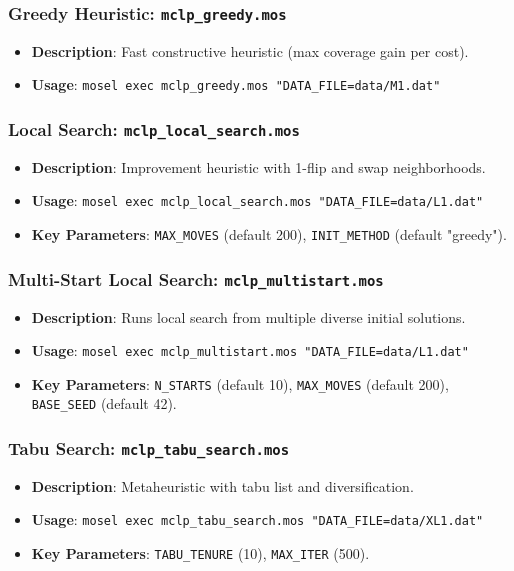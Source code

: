 \documentclass[11pt,a4paper]{article}
\begin{document}
\subsubsection{Greedy Heuristic: \texttt{mclp\_greedy.mos}}
\begin{itemize}
  \item \textbf{Description}: Fast constructive heuristic (max coverage gain per cost).
  \item \textbf{Usage}: \texttt{mosel exec mclp\_greedy.mos "DATA\_FILE=data/M1.dat"}
\end{itemize}

\subsubsection{Local Search: \texttt{mclp\_local\_search.mos}}
\begin{itemize}
  \item \textbf{Description}: Improvement heuristic with 1-flip and swap neighborhoods.
  \item \textbf{Usage}: \texttt{mosel exec mclp\_local\_search.mos "DATA\_FILE=data/L1.dat"}
  \item \textbf{Key Parameters}: \texttt{MAX\_MOVES} (default 200), \texttt{INIT\_METHOD} (default "greedy").
\end{itemize}

\subsubsection{Multi-Start Local Search: \texttt{mclp\_multistart.mos}}
\begin{itemize}
  \item \textbf{Description}: Runs local search from multiple diverse initial solutions.
  \item \textbf{Usage}: \texttt{mosel exec mclp\_multistart.mos "DATA\_FILE=data/L1.dat"}
  \item \textbf{Key Parameters}: \texttt{N\_STARTS} (default 10), \texttt{MAX\_MOVES} (default 200), \texttt{BASE\_SEED} (default 42).
\end{itemize}

\subsubsection{Tabu Search: \texttt{mclp\_tabu\_search.mos}}
\begin{itemize}
  \item \textbf{Description}: Metaheuristic with tabu list and diversification.
  \item \textbf{Usage}: \texttt{mosel exec mclp\_tabu\_search.mos "DATA\_FILE=data/XL1.dat"}
  \item \textbf{Key Parameters}: \texttt{TABU\_TENURE} (10), \texttt{MAX\_ITER} (500).
\end{itemize}
\end{document}

